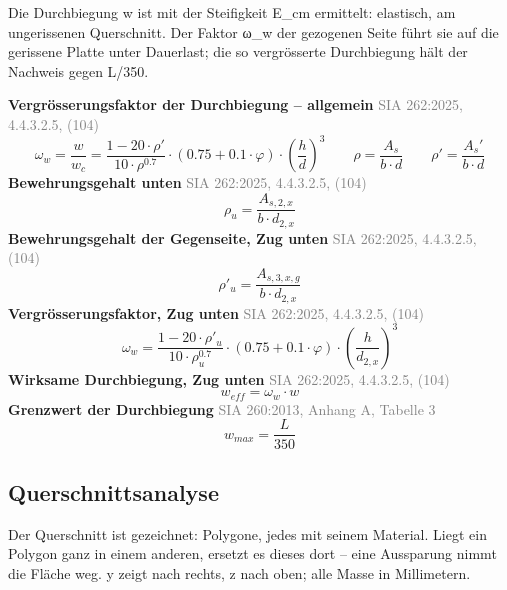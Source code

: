 \documentclass[11pt,a4paper]{article}
\newcommand{\normref}[1]{{\small\textcolor{gray}{#1}}}
\begin{document}
Die Durchbiegung w ist mit der Steifigkeit E\_cm ermittelt: elastisch, am ungerissenen Querschnitt. Der Faktor ω\_w der gezogenen Seite führt sie auf die gerissene Platte unter Dauerlast; die so vergrösserte Durchbiegung hält der Nachweis gegen L/350.

\noindent\textbf{Vergrösserungsfaktor der Durchbiegung – allgemein} \hfill \normref{SIA 262:2025, 4.4.3.2.5, (104)}
\begin{equation*}
\omega_w = \frac{w}{w_c} = \frac{1 - 20 \cdot \rho'}{10 \cdot \rho^{0.7}} \cdot \left(0.75 + 0.1 \cdot \varphi\right) \cdot \left(\frac{h}{d}\right)^{3} \qquad \rho = \frac{A_s}{b \cdot d} \qquad \rho' = \frac{A_s'}{b \cdot d}
\end{equation*}
\noindent\textbf{Bewehrungsgehalt unten} \hfill \normref{SIA 262:2025, 4.4.3.2.5, (104)}
\begin{equation*}
\rho_{u} = \frac{A_{s,2,x}}{b \cdot d_{2,x}}
\end{equation*}
\noindent\textbf{Bewehrungsgehalt der Gegenseite, Zug unten} \hfill \normref{SIA 262:2025, 4.4.3.2.5, (104)}
\begin{equation*}
\rho'_{u} = \frac{A_{s,3,x,g}}{b \cdot d_{2,x}}
\end{equation*}
\noindent\textbf{Vergrösserungsfaktor, Zug unten} \hfill \normref{SIA 262:2025, 4.4.3.2.5, (104)}
\begin{equation*}
\omega_w = \frac{1 - 20 \cdot \rho'_{u}}{10 \cdot \rho_{u}^{0.7}} \cdot \left(0.75 + 0.1 \cdot \varphi\right) \cdot \left(\frac{h}{d_{2,x}}\right)^{3}
\end{equation*}
\noindent\textbf{Wirksame Durchbiegung, Zug unten} \hfill \normref{SIA 262:2025, 4.4.3.2.5, (104)}
\begin{equation*}
w_{eff} = \omega_w \cdot w
\end{equation*}
\noindent\textbf{Grenzwert der Durchbiegung} \hfill \normref{SIA 260:2013, Anhang A, Tabelle 3}
\begin{equation*}
w_{max} = \frac{L}{350}
\end{equation*}
\subsection{Querschnittsanalyse}
Der Querschnitt ist gezeichnet: Polygone, jedes mit seinem Material. Liegt ein Polygon ganz in einem anderen, ersetzt es dieses dort – eine Aussparung nimmt die Fläche weg. y zeigt nach rechts, z nach oben; alle Masse in Millimetern.
\end{document}
